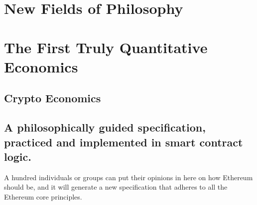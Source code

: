 \documentclass[a4paper,oneside]{article}
\begin{document}
\begin{multicols}{2}
\section{New Fields of Philosophy}

\section{The First Truly Quantitative Economics}
\subsection{Crypto Economics}

\subsection{A philosophically guided specification, practiced and implemented in smart contract logic.}

A hundred individuals or groups can put their opinions in here on how Ethereum should be, and it will generate a new specification that adheres to all the Ethereum core principles.
\end{multicols}
\end{document}
